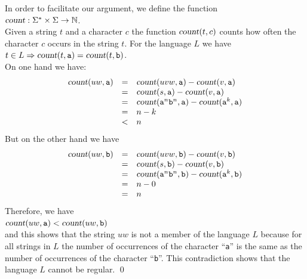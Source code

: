 In order to facilitate our argument, we define the function
\\[0.2cm]
\hspace*{1.3cm}
$\textsl{count}: \Sigma^* \times \Sigma \rightarrow \mathbb{N}$.
\\[0.2cm]
Given a  string $t$ and a character $c$ the function $\textsl{count}(t,c)$ counts how often the
character $c$ occurs in the string $t$.  For the language  $L$ we have
\\[0.2cm]
\hspace*{1.3cm}
$t \in L \Rightarrow \textsl{count}(t,\texttt{a}) = \textsl{count}(t, \texttt{b})$. 
\\[0.2cm]
On one hand we have:
\[  
\begin{array}{lcl}
\textsl{count}(uw,\texttt{a}) & = & \textsl{count}(uvw,\texttt{a}) - \textsl{count}(v,\texttt{a}) \\
 & = & \textsl{count}(s,\texttt{a}) - \textsl{count}(v,\texttt{a}) \\
 & = & \textsl{count}(\mathtt{a}^n\mathtt{b}^n,\texttt{a}) - \textsl{count}(\mathtt{a}^k,\texttt{a}) \\
 & = & n - k  \\
 & < & n   \\
\end{array}
\]
But on the other hand we have
\[  
\begin{array}{lcl}
\textsl{count}(uw,\texttt{b}) & = & \textsl{count}(uvw,\texttt{b}) - \textsl{count}(v,\texttt{b}) \\
                               & = & \textsl{count}(s,\texttt{b}) - \textsl{count}(v,\texttt{b}) \\
 & = & \textsl{count}(\mathtt{a}^n\mathtt{b}^n,\texttt{b}) - \textsl{count}(\mathtt{a}^k,\texttt{b}) \\
                               & = & n  - 0\\
                               & = & n  
\end{array}
\]
Therefore, we have
\\[0.2cm]
\hspace*{1.3cm}
$\textsl{count}(uw,\texttt{a}) < \textsl{count}(uw,\texttt{b})$
\\[0.2cm]
and this shows that the string $uw$ is not a member of the language $L$ because for all strings in $L$ 
the number of occurrences of the character ``\texttt{a}'' is the same as the number of
occurrences of the character ``\texttt{b}''.  This contradiction shows that the language $L$ cannot
be regular.
\qed

